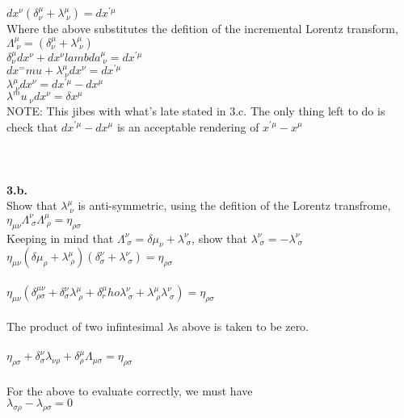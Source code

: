 \documentclass[prb,preprint]
{revtex4-1}
\newcommand{\PRLsep}{\noindent\makebox[\linewidth]{\resizebox{0.8888\linewidth}{2pt}{$\bullet$}}\bigskip}
\begin{document}
$dx^\nu\left(\delta^\mu_\nu + \lambda^\mu_{\;\nu}\right) = dx^{\prime\mu}$
\\
Where the above substitutes the defition of the incremental Lorentz transform,
\\
$\Lambda^\mu_{\;\nu} = \left(\delta^\mu_\nu + \lambda^\mu_{\;\nu}\right)$
\\
$\delta_\nu^\mu dx^\nu + dx^\nu lambda^\mu_{\;\nu} = dx^{\prime\mu}$
\\
$dx^=mu + \lambda^\mu_{\;\nu} dx^\nu = dx^{\prime\mu}$
\\
$\lambda^\mu_{\;\nu}dx^\nu = dx^{\prime\mu} - dx^\mu$
\\
$\lambda^mu_{\;\nu} dx^\nu = \delta x^\mu$
\\
NOTE:  This jibes with what's late stated in 3.c.  The only thing left to do is check that $dx^{\prime\mu} - dx^\mu$ is an acceptable rendering of $x^{\prime\mu} - x^\mu$
\\
\\
\PRLsep
\\
\\
\textbf{3.b.}
\\
Show that $\lambda^\mu_{\;\nu}$ is anti-symmetric, using the defition of the Lorentz transfrome, $\eta_{\mu\nu} \Lambda^\nu_{\;\sigma}\Lambda^\mu_{\;\rho} = \eta_{\rho\sigma}$
\\
Keeping in mind that $\Lambda^\nu_{\;\sigma} = \delta\mu_\nu + \lambda^\nu_{\;\sigma}$, show that $\lambda^\nu_{\;\sigma} = -\lambda^\nu_{\;\sigma}$
\\
$\eta_{\mu\nu}\left(\delta\mu_\rho+ \lambda^\mu_{\;\rho}\right)\left(\delta^\nu_\sigma + \lambda^\nu_{\;\sigma}\right) = \eta_{\rho\sigma}$
\\
\\
$\eta_{\mu\nu}\left(\delta^{\mu\nu}_{\rho\sigma} + \delta^\nu_\sigma \lambda^\mu_{\;\rho} + \delta^\mu_rho \lambda^\nu_{\;\sigma} + \lambda^\mu_{\;\rho}\lambda^\nu_{\;\sigma}\right) = \eta_{\rho\sigma}$
\\
\\
The product of two infintesimal $\lambda$s above is taken to be zero.
\\
\\
$\eta_{\rho\sigma} + \delta^\nu_\sigma \lambda_{\nu\rho} + \delta^\mu_\rho\Lambda_{\mu\sigma} = \eta_{\rho\sigma}$
\\
\\
For the above to evaluate correctly, we must have 
\\
$\lambda_{\sigma\rho} - \lambda_{\rho\sigma} = 0$
\\
\end{document}
